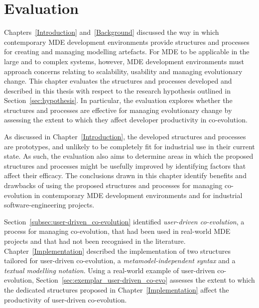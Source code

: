 
\chapter{Evaluation}
\label{Evaluation}
Chapters~\ref{Introduction} and~\ref{Background} discussed the way in which contemporary MDE development environments provide structures and processes for creating and managing modelling artefacts. For MDE to be applicable in the large and to complex systems, however, MDE development environments must approach concerns relating to scalability, usability and managing evolutionary change. This chapter evaluates the structures and processes developed and described in this thesis with respect to the research hypothesis outlined in Section~\ref{sec:hypothesis}. In particular, the evaluation explores whether the structures and processes are effective for managing evolutionary change by assessing the extent to which they affect developer productivity in co-evolution.

As discussed in Chapter~\ref{Introduction}, the developed structures and processes are prototypes, and unlikely to be completely fit for industrial use in their current state. As such, the evaluation also aims to determine areas in which the proposed structures and processes might be usefully improved by identifying factors that affect their efficacy. The conclusions drawn in this chapter identify benefits and drawbacks of using the proposed structures and processes for managing co-evolution in contemporary MDE development environments and for industrial software-engineering projects.

Section~\ref{subsec:user-driven_co-evolution} identified \emph{user-driven co-evolution}, a process for managing co-evolution, that had been used in real-world MDE projects and that had not been recognised in the literature. Chapter~\ref{Implementation} described the implementation of two structures tailored for user-driven co-evolution, a \emph{metamodel-independent syntax} and a \emph{textual modelling notation}. Using a real-world example of user-driven co-evolution, Section~\ref{sec:exemplar_user-driven_co-evo} assesses the extent to which the dedicated structures proposed in Chapter~\ref{Implementation} affect the productivity of user-driven co-evolution.


